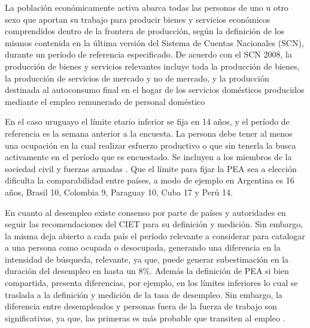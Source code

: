 \begin{center}
\begin{minipage}{0.95\linewidth}
	\vspace{1pt}%
	{\small
	La población económicamente activa abarca todas las personas de
	uno u otro sexo que aportan su trabajo para producir bienes y servicios
	económicos comprendidos dentro de la frontera de producción, según
	la definición de los mismos contenida en la última versión del Sistema
	de Cuentas Nacionales (SCN), durante un período de referencia
	especificado. De acuerdo con el SCN 2008, la producción de bienes y
	servicios relevantes incluye toda la producción de bienes, la producción
	de servicios de mercado y no de mercado, y la producción destinada al
	autoconsumo final en el hogar de los servicios domésticos producidos
	mediante el empleo remunerado de personal doméstico
	}
	\vspace{1pt}%
\end{minipage}
\end{center}

En el caso uruguayo el límite etario inferior se fija en 14 años, y el período de referencia es la semana anterior a la encuesta. La persona debe tener al menos una ocupación en la cual realizar esfuerzo productivo o que sin tenerla la busca activamente en el período que es encuestado. Se incluyen a los miembros de la sociedad civil y fuerzas armadas \cite{INE2018}. Que el límite para fijar la PEA sea a elección dificulta la comparabilidad entre países, a modo de ejemplo en Argentina es 16 años, Brasil 10, Colombia 9, Paraguay 10, Cuba 17 y Perú 14.



En cuanto al desempleo existe consenso por parte de países y autoridades en seguir las recomendaciones del CIET para su definición y medición. Sin embargo, la misma deja abierto a cada país el período relevante a considerar para catalogar a una persona como ocupada o desocupada, generando una diferencia en la intensidad de búsqueda\cite{Elsby2015}, relevante, ya que, puede generar subestimación en la duración del desempleo en hasta un 8\%\cite{Poterba}. Además la definición de PEA si bien compartida, presenta diferencias, por ejemplo, en los límites inferiores lo cual se traslada a la definición y medición de la tasa de desempleo. Sin embargo, la diferencia entre desempleados y personas fuera de la fuerza de trabajo son significativas, ya que, las primeras es más probable que transiten al empleo \cite{Flinn y Heckaman}.

